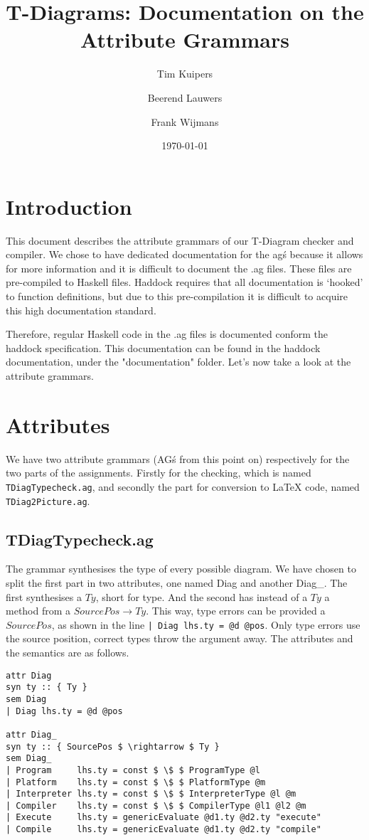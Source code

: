 \documentclass[10pt,a4paper,onecolumn]{article}
\author{Tim Kuipers \and Beerend Lauwers \and Frank Wijmans}
\title{T-Diagrams: Documentation on the Attribute Grammars}
\date{\today}
\begin{document}
	\maketitle
	
	\section{Introduction}

	This document describes the attribute grammars of our T-Diagram checker and compiler.
	We chose to have dedicated documentation for the ag\'s because it allows for more information and it is difficult to document the .ag files.
	These files are pre-compiled to Haskell files.
	Haddock requires that all documentation is `hooked' to function definitions, but due to this pre-compilation it is difficult to acquire this high documentation standard.

	Therefore, regular Haskell code in the .ag files is documented conform the haddock specification. This documentation can be found in the haddock documentation, under the "documentation" folder. Let's now take a look at the attribute grammars.


	\section {Attributes}
	
	We have two attribute grammars (AG\'s from this point on) respectively for the two parts of the assignments. 
	Firstly for the checking, which is named \texttt{TDiagTypecheck.ag}, and secondly the part for conversion to LaTeX code, named \texttt{TDiag2Picture.ag}.

		\subsection{TDiagTypecheck.ag}
		The grammar synthesises the type of every possible diagram. 
		We have chosen to split the first part in two attributes, one named Diag and another Diag\_.
		The first synthesises a $ Ty $, short for type.
		And the second has instead of a $ Ty $ a method from a $ SourcePos \rightarrow Ty $.
		This way, type errors can be provided a $ SourcePos $, as shown in the line \texttt{| Diag lhs.ty = @d @pos}.
		Only type errors use the source position, correct types throw the argument away.
		The attributes and the semantics are as follows.
		
\begin{lstlisting}[mathescape=true]
attr Diag
syn ty :: { Ty }
sem Diag
| Diag lhs.ty = @d @pos

attr Diag_
syn ty :: { SourcePos $ \rightarrow $ Ty }
sem Diag_
| Program     lhs.ty = const $ \$ $ ProgramType @l
| Platform    lhs.ty = const $ \$ $ PlatformType @m
| Interpreter lhs.ty = const $ \$ $ InterpreterType @l @m
| Compiler    lhs.ty = const $ \$ $ CompilerType @l1 @l2 @m
| Execute     lhs.ty = genericEvaluate @d1.ty @d2.ty "execute"
| Compile     lhs.ty = genericEvaluate @d1.ty @d2.ty "compile"
\end{lstlisting}
\end{document}
